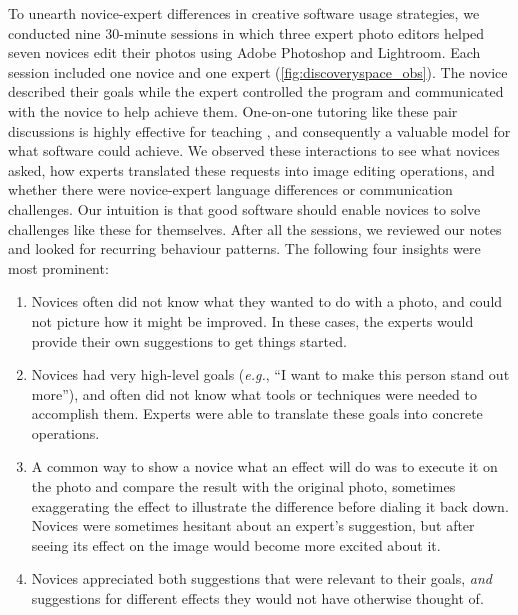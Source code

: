 To unearth novice-expert differences in creative software usage strategies, we conducted nine 30-minute sessions in which three expert photo editors helped seven novices edit their photos using Adobe Photoshop and Lightroom. Each session included one novice and one expert (\autoref{fig:discoveryspace_obs}). The novice described their goals while the expert controlled the program and communicated with the novice to help achieve them. One-on-one tutoring like these pair discussions is highly effective for teaching \cite{Bloom1984}, and consequently a valuable model for what software could achieve. We observed these interactions to see what novices asked, how experts translated these requests into image editing operations, and whether there were novice-expert language differences or communication challenges. Our intuition is that good software should enable novices to solve challenges like these for themselves. After all the sessions, we reviewed our notes and looked for recurring behaviour patterns. The following four insights were most prominent:
\begin{enumerate}
    \item Novices often did not know what they wanted to do with a photo, and could not picture how it might be improved. In these cases, the experts would provide their own suggestions to get things started.
    \item Novices had very high-level goals (\textit{e.g.}, ``I want to make this person stand out more''), and often did not know what tools or techniques were needed to accomplish them. Experts were able to translate these goals into concrete operations.
    \item A common way to show a novice what an effect will do was to execute it on the photo and compare the result with the original photo, sometimes exaggerating the effect to illustrate the difference before dialing it back down. Novices were sometimes hesitant about an expert's suggestion, but after seeing its effect on the image would become more excited about it.
    \item Novices appreciated both suggestions that were relevant to their goals, \textit{and} suggestions for different effects they would not have otherwise thought of.
\end{enumerate}
